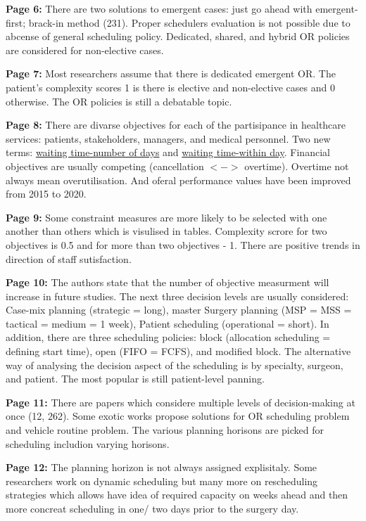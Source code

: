     \textbf{Page 6:}
    There are two solutions to emergent cases: just go ahead with emergent-first; brack-in method (231). Proper schedulers evaluation is not possible due to abcense of general scheduling policy.
    Dedicated, shared, and hybrid OR policies are considered for non-elective cases. 
    
    \textbf{Page 7:}
    Most researchers assume that there is dedicated emergent OR. The patient's complexity scores 1 is there is elective and non-elective cases and 0 otherwise. The OR policies is still a debatable topic.
    
    \textbf{Page 8:}
    There are divarse objectives for each of the partisipance in healthcare services: patients, stakeholders, managers, and medical personnel. Two new terms: \underline{waiting time-number of days} and \underline{waiting time-within day}. Financial objectives are usually competing (cancellation $<->$ overtime). Overtime not always mean overutilisation. And oferal performance values have been improved from 2015 to 2020.
    
    \textbf{Page 9:}
    Some constraint measures are more likely to be selected with one another than others which is visulised in tables. Complexity scrore for two objectives is 0.5 and for more than two objectives - 1. There are positive trends in direction of staff sutisfaction.
    
    \textbf{Page 10:}
    The authors state that the number of objective measurment will increase in future studies. The next three decision levels are usually considered: Case-mix planning (strategic = long), master Surgery planning (MSP = MSS = tactical = medium = 1 week), Patient scheduling (operational = short). In addition, there are three scheduling policies: block (allocation scheduling = defining start time), open (FIFO = FCFS), and modified block. The alternative way of analysing the decision aspect of the scheduling is by specialty, surgeon, and patient. The most popular is still patient-level panning. 
    
    \textbf{Page 11:}
    There are papers which considere multiple levels of decision-making at once (12, 262). Some exotic works propose solutions for OR scheduling problem and vehicle routine problem. The various planning horisons are picked for scheduling includion varying horisons.

    \textbf{Page 12:}
    The planning horizon is not always assigned explisitaly. Some researchers work on dynamic scheduling but many more on rescheduling strategies which allows have idea of required capacity on weeks ahead and then more concreat scheduling in one/ two days prior to the surgery day.
    
